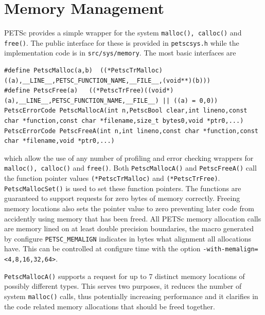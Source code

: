 \section{Memory Management}

PETSc provides a simple wrapper for the system \lstinline{malloc(), calloc()} and \lstinline{free()}. The public interface for these is provided in \lstinline{petscsys.h} while the implementation code is in \lstinline{src/sys/memory}. The most basic interfaces are

\begin{lstlisting}
#define PetscMalloc(a,b)  ((*PetscTrMalloc)((a),__LINE__,PETSC_FUNCTION_NAME,__FILE__,(void**)(b)))
#define PetscFree(a)   ((*PetscTrFree)((void*)(a),__LINE__,PETSC_FUNCTION_NAME,__FILE__) || ((a) = 0,0))
PetscErrorCode PetscMallocA(int n,PetscBool clear,int lineno,const char *function,const char *filename,size_t bytes0,void *ptr0,...)
PetscErrorCode PetscFreeA(int n,int lineno,const char *function,const char *filename,void *ptr0,...)
\end{lstlisting}
which allow the use of any number of profiling and error checking wrappers for \lstinline{malloc(), calloc()} and \lstinline{free()}.
Both \lstinline{PetscMallocA()} and \lstinline{PetscFreeA()} call the function pointer values  \lstinline{(*PetscTrMalloc)} and \lstinline{(*PetscTrFree)}.
\lstinline{PetscMallocSet()} is used to set these function pointers.
The functions are guaranteed to support requests for zero bytes of memory correctly. Freeing memory locations also sets the pointer value to zero preventing later code from accidently using memory that has been freed. All PETSc memory allocation calls are memory lined on at least double precision boundaries, the macro generated by configure \lstinline{PETSC_MEMALIGN} indicates in bytes what alignment all allocations have. This can be controlled at configure time with the option \lstinline{-with-memalign=<4,8,16,32,64>}.


\lstinline{PetscMallocA()} supports a request for up to 7 distinct memory locations of possibly different types. This serves two purposes, it reduces the number of system  \lstinline{malloc()} calls, thus potentially increasing performance and it clarifies in the code related memory allocations that should be freed together.

